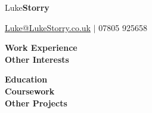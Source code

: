 \documentclass[10pt]{article}
\newcommand{\sect}[1]{{\LARGE{\textbf{#1}}}\vspace{0.1em}\\}
\begin{document}
\begin{center}
{\Huge{{Luke}\textbf{Storry}}}

{\large \href{mailto:Luke@LukeStorry.co.uk}{Luke@LukeStorry.co.uk} $|$ 07805 925658}\\

{\textcolor{linecol}\hrulefill}
\end{center}
\begin{minipage}[t]{0.28\textwidth} 




\sect{Work Experience}

\sect{Other Interests}



\end{minipage} 
\hfill
\begin{minipage}[t]{0.7\textwidth} 
\sect{Education}

\sect{Coursework}

\sect{Other Projects}


\end{minipage} 
\end{document}
